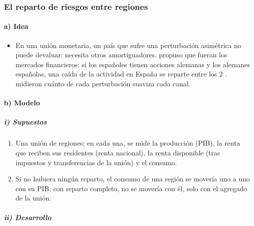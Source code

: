 \documentclass[11pt]{article}
\begin{document}
\subsubsection{El reparto de riesgos entre regiones}\label{sec:risk-sharing}

\paragraph{a) Idea}

\begin{itemize}
\item En una unión monetaria, un país que sufre una perturbación asimétrica no puede devaluar: necesita otros amortiguadores.  propuso que fueran los mercados financieros: si los españoles tienen acciones alemanas y los alemanes españolas, una caída de la actividad en España se reparte entre los 2 . \textcite{AsdrubaliSorensenYosha1996Channels} midieron cuánto de cada perturbación suaviza cada canal.
\end{itemize}

\paragraph{b) Modelo}

\subparagraph{i) Supuestos}

\begin{enumerate}
\item Una unión de regiones; en cada una, se mide la producción (PIB), la renta que reciben sus residentes (renta nacional), la renta disponible (tras impuestos y transferencias de la unión) y el consumo.
\item Si no hubiera ningún reparto, el consumo de una región se movería uno a uno con su PIB; con reparto completo, no se movería con él, solo con el agregado de la unión.
\end{enumerate}

\subparagraph{ii) Desarrollo}
\end{document}
